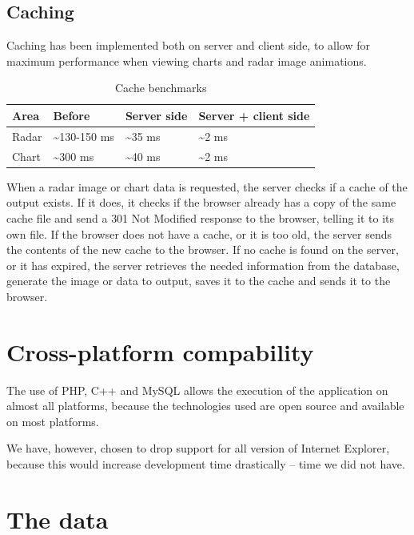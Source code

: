 \subsection{Caching}
Caching has been implemented both on server and client side, to allow for maximum performance when viewing charts and radar image animations.

\begin{table}[htbp]
\centering
\begin{tabular}{|l|l|l|l|}
\hline
\textbf{Area} & \textbf{Before} & \textbf{Server side} & \textbf{Server + client side}\\
\hline
Radar & \textasciitilde 130-150 ms & \textasciitilde 35 ms & \textasciitilde 2 ms\\
\hline
Chart & \textasciitilde 300 ms & \textasciitilde 40 ms & \textasciitilde 2 ms\\
\hline
\end{tabular}
\label{tab:cache_benchmarks}
\caption{Cache benchmarks}
\end{table}

When a radar image or chart data is requested, the server checks if a cache of the output exists. If it does, it checks if the browser already has a copy of the same cache file and send a \textsf{301 Not Modified} response to the browser, telling it to its own file.
If the browser does not have a cache, or it is too old, the server sends the contents of the new cache to the browser.
If no cache is found on the server, or it has expired, the server retrieves the needed information from the database, generate the image or data to output, saves it to the cache and sends it to the browser.

\section{Cross-platform compability}
\label{sec:cross-platform}
The use of PHP, C++ and MySQL allows the execution of the application on almost all platforms, because the technologies used are open source and available on most platforms.

We have, however, chosen to drop support for all version of Internet Explorer, because this would increase development time drastically -- time we did not have.

\section{The data}
